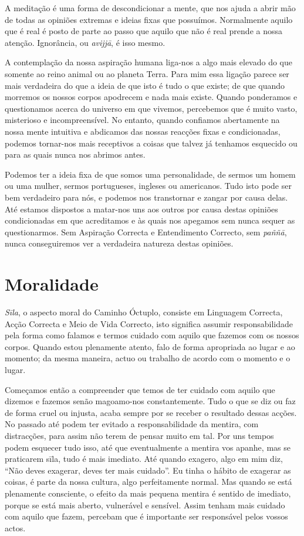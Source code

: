 A meditação é uma forma de descondicionar a mente, que nos ajuda a abrir mão de
todas as opiniões extremas e ideias fixas que possuímos. Normalmente aquilo que
é real é posto de parte ao passo que aquilo que não é real prende a nossa
atenção. Ignorância, ou \emph{avijjā}, é isso mesmo.

A contemplação da nossa aspiração humana liga-nos a algo mais elevado do que
somente ao reino animal ou ao planeta Terra. Para mim essa ligação parece ser
mais verdadeira do que a ideia de que isto é tudo o que existe; de que quando
morremos os nossos corpos apodrecem e nada mais existe. Quando ponderamos e
questionamos acerca do universo em que vivemos, percebemos que é muito vasto,
misterioso e incompreensível. No entanto, quando confiamos abertamente na nossa
mente intuitiva e abdicamos das nossas reacções fixas e condicionadas, podemos
tornar-nos mais receptivos a coisas que talvez já tenhamos esquecido ou para as
quais nunca nos abrimos antes.

Podemos ter a ideia fixa de que somos uma personalidade, de sermos um homem ou
uma mulher, sermos portugueses, ingleses ou americanos. Tudo isto pode ser bem
verdadeiro para nós, e podemos nos transtornar e zangar por causa delas. Até
estamos dispostos a matar-nos uns aos outros por causa destas opiniões
condicionadas em que acreditamos e às quais nos apegamos sem nunca sequer as
questionarmos. Sem Aspiração Correcta e Entendimento Correcto, sem \emph{paññā},
nunca conseguiremos ver a verdadeira natureza destas opiniões.

\section{Moralidade}

\emph{Sīla}, o aspecto moral do Caminho Óctuplo, consiste em Linguagem Correcta,
Acção Correcta e Meio de Vida Correcto, isto significa assumir responsabilidade
pela forma como falamos e termos cuidado com aquilo que fazemos com os nossos
corpos. Quando estou plenamente atento, falo de forma apropriada ao lugar e ao
momento; da mesma maneira, actuo ou trabalho de acordo com o momento e o lugar.

Começamos então a compreender que temos de ter cuidado com aquilo que dizemos e
fazemos senão magoamo-nos constantemente. Tudo o que se diz ou faz de forma
cruel ou injusta, acaba sempre por se receber o resultado dessas acções. No
passado até podem ter evitado a responsabilidade da mentira, com distracções,
para assim não terem de pensar muito em tal. Por uns tempos podem esquecer tudo
isso, até que eventualmente a mentira vos apanhe, mas se praticarem sīla, tudo é
mais imediato. Até quando exagero, algo em mim diz, “Não deves exagerar, deves
ter mais cuidado”. Eu tinha o hábito de exagerar as coisas, é parte da nossa
cultura, algo perfeitamente normal. Mas quando se está plenamente consciente, o
efeito da mais pequena mentira é sentido de imediato, porque se está mais
aberto, vulnerável e sensível. Assim tenham mais cuidado com aquilo que fazem,
percebam que é importante ser responsável pelos vossos actos.

